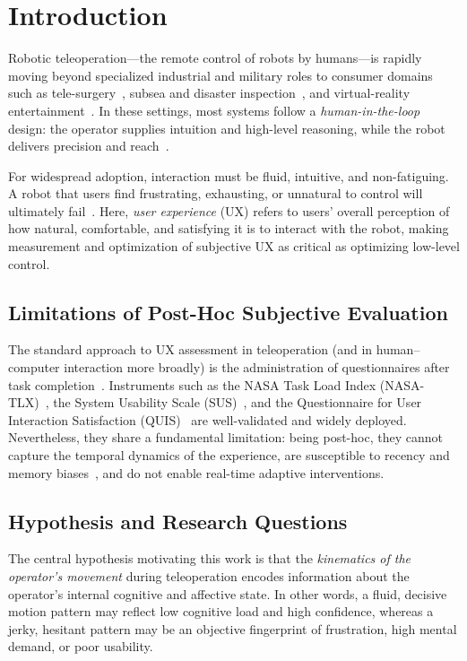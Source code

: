 \section{Introduction}\label{sec:intro}

Robotic teleoperation---the remote control of robots by humans---is rapidly moving beyond specialized industrial and military roles to consumer domains such as tele-surgery~\cite{moustris2023}, subsea and disaster inspection~\cite{lichiardopol2007}, and virtual-reality entertainment~\cite{lichiardopol2007}. In these settings, most systems follow a \emph{human-in-the-loop} design: the operator supplies intuition and high-level reasoning, while the robot delivers precision and reach~\cite{lichiardopol2007}.

For widespread adoption, interaction must be fluid, intuitive, and non-fatiguing. A robot that users find frustrating, exhausting, or unnatural to control will ultimately fail~\cite{yang2017}. Here, \emph{user experience} (UX) refers to users' overall perception of how natural, comfortable, and satisfying it is to interact with the robot, making measurement and optimization of subjective UX as critical as optimizing low-level control.

\subsection{Limitations of Post-Hoc Subjective Evaluation}

The standard approach to UX assessment in teleoperation (and in human--computer interaction more broadly) is the administration of questionnaires after task completion~\cite{rueben2020}. Instruments such as the NASA Task Load Index (NASA-TLX)~\cite{hart1988}, the System Usability Scale (SUS)~\cite{brooke1996}, and the Questionnaire for User Interaction Satisfaction (QUIS)~\cite{chin1988} are well-validated and widely deployed. Nevertheless, they share a fundamental limitation: being post-hoc, they cannot capture the temporal dynamics of the experience, are susceptible to recency and memory biases~\cite{sreenivas2020}, and do not enable real-time adaptive interventions.

\subsection{Hypothesis and Research Questions}

The central hypothesis motivating this work is that the \emph{kinematics of the operator's movement} during teleoperation encodes information about the operator's internal cognitive and affective state. In other words, a fluid, decisive motion pattern may reflect low cognitive load and high confidence, whereas a jerky, hesitant pattern may be an objective fingerprint of frustration, high mental demand, or poor usability.

